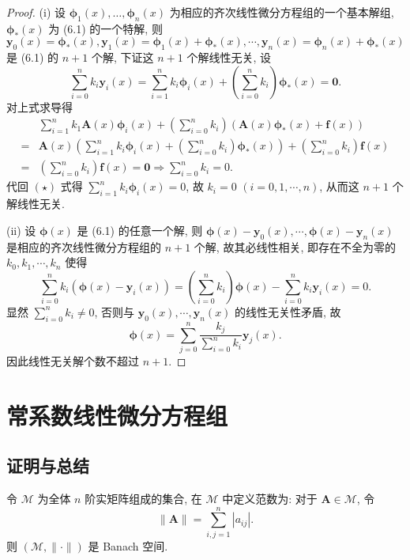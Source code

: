 \begin{proof}
  (i) 设 $\bm{\phi}_1(x),\ldots,\bm{\phi}_n(x)$ 为相应的齐次线性微分方程组的一个基本解组, 
  $\bm{\phi}_*(x)$ 为 (6.1) 的一个特解, 
  则 $\bm{y}_0(x)=\bm{\phi}_*(x),\bm{y}_1(x)=\bm{\phi}_1(x)+\bm{\phi}_*(x),\cdots,\bm{y}_n(x)=\bm{\phi}_n(x)+\bm{\phi}_*(x)$
  是 (6.1) 的 $n+1$ 个解, 下证这 $n+1$ 个解线性无关, 设
  \begin{equation}
    \sum_{i=0}^nk_i\bm{y}_i(x)=\sum_{i=1}^nk_i\bm{\phi}_i(x)+\left(\sum_{i=0}^nk_i\right)\bm{\phi}_*(x)
      = \bm{0}.\tag{$\star$}
  \end{equation}
  对上式求导得
  \begin{align*}
    & \sum_{i=1}^nk_1\bm{A}(x)\bm{\phi}_i(x)+\left(\sum_{i=0}^nk_i\right)\left(\bm{A}(x)\bm{\phi}_*(x)+\bm{f}(x)\right)\\
    ={} & \bm{A}(x)\left(\sum_{i=1}^nk_i\bm{\phi}_i(x)+\left(\sum_{i=0}^nk_i\right)\bm{\phi}_*(x)\right)+\left(\sum_{i=0}^nk_i\right)\bm{f}(x)\\
    ={} & \left(\sum_{i=0}^nk_i\right)\bm{f}(x)=\bm{0}\Rightarrow\sum_{i=0}^nk_i=0.
  \end{align*}
  代回 $(\star)$ 式得 $\sum_{i=1}^nk_i\bm{\phi}_i(x)=0$, 
  故 $k_i=0$ $(i=0,1,\cdots,n)$, 从而这 $n+1$ 个解线性无关.

  (ii) 设 $\bm{\phi}(x)$ 是 (6.1) 的任意一个解, 
  则 $\bm{\phi}(x)-\bm{y}_0(x),\cdots,\bm{\phi}(x)-\bm{y}_n(x)$
  是相应的齐次线性微分方程组的 $n+1$ 个解, 故其必线性相关, 即存在不全为零的 $k_0,k_1,\cdots,k_n$ 使得
  \[\sum_{i=0}^nk_i(\bm{\phi}(x)-\bm{y}_i(x))
    = \left(\sum_{i=0}^nk_i\right)\bm{\phi}(x)-\sum_{i=0}^nk_i\bm{y}_i(x)=0.\]
  显然 $\sum_{i=0}^nk_i\neq 0$, 否则与 $\bm{y}_0(x),\cdots,\bm{y}_n(x)$ 的线性无关性矛盾, 故
  \[\bm{\phi}(x)=\sum_{j=0}^n\frac{k_j}{\sum_{i=0}^nk_i}\bm{y}_j(x).\]
  因此线性无关解个数不超过 $n+1$.
\end{proof}



\section{常系数线性微分方程组}



\subsection{证明与总结}



\begin{conclusion}[教材 Page 170]
  令 $\mathcal{M}$ 为全体 $n$ 阶实矩阵组成的集合,
  在 $\mathcal{M}$ 中定义范数为: 对于 $\bm{A}\in\mathcal{M}$, 令
  \[\|\bm{A}\| = \sum_{i,j=1}^n |a_{ij}|.\]
  则 $(\mathcal{M},\|\cdot\|)$ 是 Banach 空间.
\end{conclusion}

